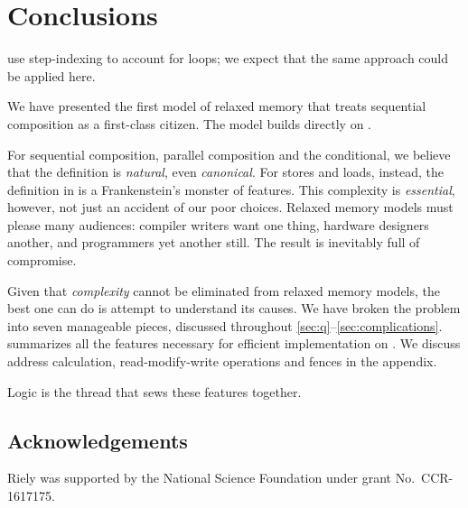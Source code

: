 \section{Conclusions}

\citet{DBLP:conf/esop/PaviottiCPWOB20} use step-indexing to account for
loops; we expect that the same approach could be applied here.

We have presented the first model of relaxed memory that treats sequential
composition as a first-class citizen. The model builds directly on \jjr{}.

For sequential composition, parallel composition and the conditional, we
believe that the definition is \emph{natural}, even \emph{canonical}.
For stores and loads, instead, the definition in  is a
Frankenstein's monster of features.  This complexity is \emph{essential},
however, not just an accident of our poor choices.  Relaxed memory models must
please many audiences: compiler writers want one thing, hardware designers
another, and programmers yet another still.  The result is inevitably full of
compromise.

Given that \emph{complexity} cannot be eliminated from relaxed memory models,
the best one can do is attempt to understand its causes.  We have broken the
problem into seven manageable pieces, discussed throughout
\textsection\ref{sec:q}--\ref{sec:complications}.  
summarizes all the features necessary for efficient implementation on
\armeight{}.  We discuss address calculation, read-modify-write operations
and fences in the appendix.

{Logic} is the thread that sews these features together.






\subsection*{Acknowledgements}
Riely was supported by the National Science Foundation under
grant No.~CCR-1617175.


